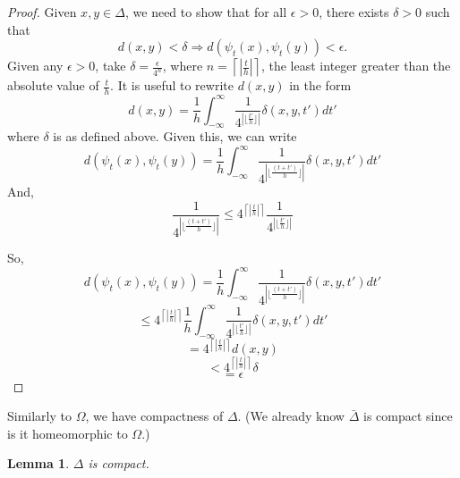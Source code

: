 \documentclass[11pt]{article}
\newtheorem{lem}[thm]{Lemma}
\begin{document}
\begin{proof}
Given $x, y \in \Delta$, we need to show that for all $\epsilon > 0$, there exists $\delta > 0$ such that
$$d(x,y) < \delta \Rightarrow d(\psi_t(x),\psi_t(y))<\epsilon.$$
Given any $\epsilon >0$, take $\delta = \frac{\epsilon}{4^n}$, where $n = \left\lceil|\frac{t}{h}|\right\rceil$, the least integer greater than the absolute value of $\frac{t}{h}$.  It is useful to rewrite $d(x,y)$ in the form
$$ d(x,y) = \frac{1}{h} \int_{-\infty}^{\infty}{\frac{1}{4^{\left |\lfloor \frac{t'}{h}\rfloor \right |}}\delta(x,y,t')dt'}$$
where $\delta$ is as defined above.  Given this, we can write
$$ d(\psi_t(x),\psi_t(y)) = \frac{1}{h} \int_{-\infty}^{\infty}{\frac{1}{4^{\left | \lfloor \frac{(t+t')}{h}  \rfloor \right |}}\delta(x,y,t')dt'}$$
And,
$$ \frac{1}{4^{\left | \lfloor \frac{(t+t')}{h} \rfloor \right |}} \leq 4^{\left \lceil |\frac{t}{h}| \right \rceil} \frac{1}{4^{\left | \lfloor \frac{t'}{h} \rfloor \right|}}$$

So, $$ d(\psi_t(x),\psi_t(y)) = \frac{1}{h} \int_{-\infty}^{\infty}{\frac{1}{4^{\left |\lfloor \frac{(t+t')}{h}  \rfloor \right |}}\delta(x,y,t')dt'}$$
$$ \leq 4^{\left \lceil |\frac{t}{h}| \right \rceil} \frac{1}{h} \int_{-\infty}^{\infty}{\frac{1}{4^{\left |\lfloor \frac{t'}{h} \rfloor \right|}}\delta(x,y,t')dt'}$$
$$ = 4^{\left \lceil |\frac{t}{h}| \right \rceil} d(x,y)$$
$$ < 4^{\left \lceil |\frac{t}{h}| \right \rceil} \delta$$
$$ = \epsilon$$
\end{proof}

Similarly to $\Omega$, we have compactness of $\Delta$. (We already know $\bar\Delta$ is compact since is it homeomorphic to $\Omega$.)

\begin{lem}\label{deltabarcompact}
 $\Delta$ is compact.
\end{lem}
\end{document}
